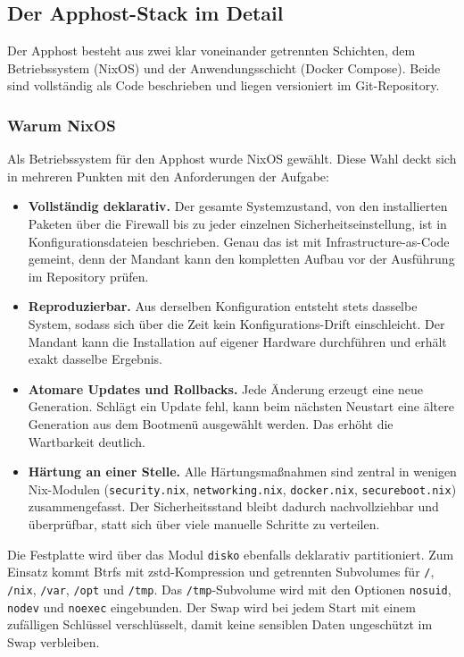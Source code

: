 \subsection{Der Apphost-Stack im Detail}

Der Apphost besteht aus zwei klar voneinander getrennten Schichten, dem
Betriebssystem (NixOS) und der Anwendungsschicht (Docker Compose). Beide sind
vollständig als Code beschrieben und liegen versioniert im Git-Repository.

\subsubsection{Warum NixOS}
\label{sec:warum-nixos}

Als Betriebssystem für den Apphost wurde NixOS gewählt. Diese Wahl deckt sich
in mehreren Punkten mit den Anforderungen der Aufgabe:

\begin{itemize}
  \item \textbf{Vollständig deklarativ.} Der gesamte Systemzustand, von den
    installierten Paketen über die Firewall bis zu jeder einzelnen
    Sicherheitseinstellung, ist in Konfigurationsdateien beschrieben. Genau
    das ist mit Infrastructure-as-Code gemeint, denn der Mandant kann den
    kompletten Aufbau vor der Ausführung im Repository prüfen.
  \item \textbf{Reproduzierbar.} Aus derselben Konfiguration entsteht stets
    dasselbe System, sodass sich über die Zeit kein Konfigurations-Drift
    einschleicht. Der Mandant kann die Installation auf eigener Hardware
    durchführen und erhält exakt dasselbe Ergebnis.
  \item \textbf{Atomare Updates und Rollbacks.} Jede Änderung erzeugt eine
    neue Generation. Schlägt ein Update fehl, kann beim nächsten Neustart
    eine ältere Generation aus dem Bootmenü ausgewählt werden. Das erhöht die
    Wartbarkeit deutlich.
  \item \textbf{Härtung an einer Stelle.} Alle Härtungsmaßnahmen sind zentral
    in wenigen Nix-Modulen (\texttt{security.nix}, \texttt{networking.nix},
    \texttt{docker.nix}, \texttt{secureboot.nix}) zusammengefasst. Der
    Sicherheitsstand bleibt dadurch nachvollziehbar und überprüfbar, statt
    sich über viele manuelle Schritte zu verteilen.
\end{itemize}

Die Festplatte wird über das Modul \texttt{disko} ebenfalls deklarativ
partitioniert. Zum Einsatz kommt Btrfs mit zstd-Kompression und getrennten
Subvolumes für \texttt{/}, \texttt{/nix}, \texttt{/var}, \texttt{/opt} und
\texttt{/tmp}. Das \texttt{/tmp}-Subvolume wird mit den Optionen
\texttt{nosuid}, \texttt{nodev} und \texttt{noexec} eingebunden. Der Swap
wird bei jedem Start mit einem zufälligen Schlüssel verschlüsselt, damit
keine sensiblen Daten ungeschützt im Swap verbleiben.

